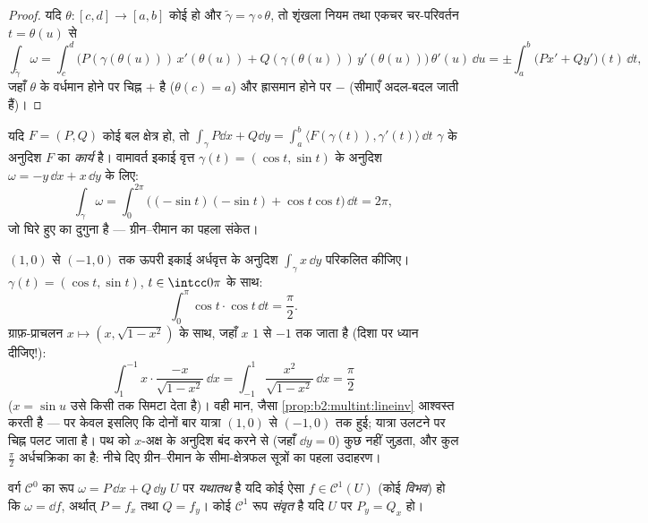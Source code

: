 \begin{proof}
यदि $\theta \colon [c, d] \to [a, b]$ कोई  हो और $\tilde\gamma = \gamma \circ \theta$, तो शृंखला नियम तथा
एकचर चर-परिवर्तन $t = \theta(u)$ से
\[
\int_{\tilde\gamma}\omega
= \int_c^d \bigl(P(\gamma(\theta(u)))\,x'(\theta(u))
+ Q(\gamma(\theta(u)))\,y'(\theta(u))\bigr)\,\theta'(u)\,\dd u
= \pm\int_a^b \bigl(Px' + Qy'\bigr)(t)\,\dd t ,
\]
जहाँ $\theta$ के वर्धमान होने पर चिह्न $+$ है ($\theta(c) = a$) और ह्रासमान होने
पर $-$ (सीमाएँ अदल-बदल जाती हैं)।
\end{proof}

\begin{example}[किसी बल का कार्य; परिसंचरण]\label{ex:b2:multint:work}
यदि $F = (P, Q)$ कोई बल क्षेत्र हो, तो $\int_\gamma P\dd x + Q\dd y =
\int_a^b \langle F(\gamma(t)), \gamma'(t)\rangle\,\dd t$ $\gamma$ के अनुदिश $F$ का
\emph{कार्य} है। वामावर्त इकाई वृत्त $\gamma(t) =
(\cos t, \sin t)$ के अनुदिश $\omega = -y\,\dd x +
x\,\dd y$ के लिए:
\[
\int_\gamma \omega
= \int_0^{2\pi}\bigl((-\sin t)(-\sin t)
+ \cos t\cos t\bigr)\,\dd t = 2\pi ,
\]
जो घिरे हुए  का दुगुना है --- ग्रीन--रीमान का पहला संकेत।
\end{example}

\begin{example}[एक समाकल, दो प्राचलन, एक
चिह्न-जाल]\label{ex:b2:multint:semicircle}
$(1, 0)$ से $(-1, 0)$ तक ऊपरी इकाई अर्धवृत्त के अनुदिश $\int_\gamma x\,\dd y$ परिकलित कीजिए।
$\gamma(t) =
(\cos t, \sin t)$, $t \in \intcc0\pi$ के साथ:
\[
\int_0^\pi\cos t\cdot\cos t\,\dd t = \frac\pi2 .
\]
ग्राफ़-प्राचलन $x \mapsto (x, \sqrt{1 -
x^2})$ के साथ, जहाँ $x$ $1$ से $-1$ तक जाता है (दिशा
पर ध्यान दीजिए!):
\[
\int_1^{-1}x\cdot\frac{-x}{\sqrt{1 - x^2}}\,\dd x
= \int_{-1}^{1}\frac{x^2}{\sqrt{1 - x^2}}\,\dd x
= \frac\pi2
\]
($x = \sin u$ उसे किसी  तक सिमटा देता है)। वही मान, जैसा \cref{prop:b2:multint:lineinv}
आश्वस्त करती है --- पर केवल इसलिए कि दोनों बार यात्रा $(1,0)$ से $(-1,0)$
तक हुई; यात्रा उलटने पर चिह्न पलट जाता है। पथ को $x$-अक्ष के
अनुदिश बंद करने से (जहाँ $\dd y = 0$) कुछ नहीं जुड़ता, और कुल $\frac\pi2$
अर्धचक्रिका का  है: नीचे दिए ग्रीन--रीमान के
सीमा-क्षेत्रफल सूत्रों का पहला उदाहरण।
\end{example}

\begin{definition}[यथातथ और संवृत रूप]\label{def:b2:multint:exact}
वर्ग $\mathcal{C}^0$ का रूप $\omega = P\,\dd x + Q\,\dd y$ $U$ पर \emph{यथातथ} है यदि
कोई ऐसा $f \in \mathcal{C}^1(U)$ (कोई \emph{विभव}) हो कि $\omega = \dd f$, अर्थात्
$P = f_x$ तथा $Q
= f_y$। कोई $\mathcal{C}^1$ रूप \emph{संवृत} है यदि
$U$ पर $P_y = Q_x$ हो।
\end{definition}

